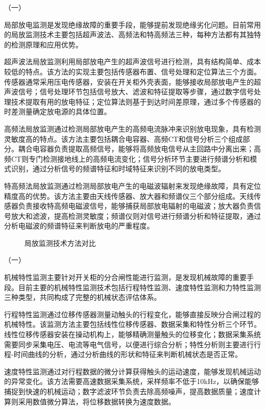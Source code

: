 （一）

局部放电监测是发现绝缘故障的重要手段，能够提前发现绝缘劣化问题。目前常用的局放监测技术主要包括超声波法、高频法和特高频法三种，每种方法都有其独特的检测原理和应用优势。

超声波法局放监测利用局部放电产生的超声波信号进行检测，具有结构简单、成本较低的特点。该方法的实现主要包括传感器布置、信号处理和定位算法三个方面。传感器通常采用压电传感器，安装在开关柜外壳表面，能够接收局部放电产生的超声波信号；信号处理环节包括信号放大、滤波和特征提取等步骤，通过数字信号处理技术提取有用的放电特征；定位算法则基于到达时间差原理，通过多个传感器的时差测量确定放电源的具体位置。

高频法局放监测通过检测局部放电产生的高频电流脉冲来识别放电现象，具有检测灵敏度高的特点。该方法主要包括耦合电容器、高频CT和信号分析三个组成部分。耦合电容器负责提取高频信号，能够将高频放电信号从主回路中分离出来；高频CT则专门检测接地线上的高频电流变化；信号分析环节主要进行频谱分析和模式识别，通过分析信号的频谱特征和时域特征来识别不同的放电类型。

特高频法局放监测通过检测局部放电产生的电磁波辐射来发现绝缘故障，具有定位精度高的优势。该方法主要由天线传感器、放大器和频谱仪三个部分组成。天线传感器负责接收特高频电磁波信号，能够捕获局部放电辐射的电磁波；放大器负责信号放大和滤波，提高检测灵敏度；频谱仪则对信号进行频谱分析和特征提取，通过分析电磁波的频谱特征来判断放电的严重程度。

\begin{figure}[h]
\centering
\caption{局放监测技术方法对比}
\label{fig:pd_monitoring_methods}
\end{figure}

（一）

机械特性监测主要针对开关柜的分合闸性能进行监测，是发现机械故障的重要手段。目前主要的机械特性监测技术包括行程特性监测、速度特性监测和力特性监测三种类型，共同构成了完整的机械状态评估体系。

行程特性监测通过位移传感器测量动触头的行程变化，能够直接反映分合闸过程的机械特性。该监测方法主要包括线性位移传感器、数据采集和特性分析三个环节。线性位移传感器安装在操动机构上，能够精确测量触头的位移变化；数据采集系统需要同步采集电压、电流等电气信号，以便进行综合分析；特性分析则主要进行行程-时间曲线的分析，通过分析曲线的形状和特征来判断机械状态是否正常。

速度特性监测通过对行程数据的微分计算获得触头的运动速度，能够发现机械运动的异常变化。该方法需要高速数据采集系统，采样频率不低于10kHz，以确保能够捕捉到快速的机械运动；数字滤波环节负责去除高频噪声，提高数据质量；速度计算则采用数值微分算法，将位移数据转换为速度数据。


